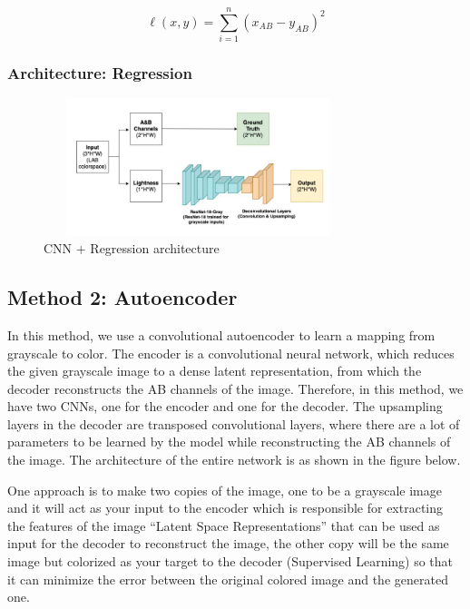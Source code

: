 \documentclass{article}
\begin{document}
{\Large
\begin{equation}
    \ell(x,y) = \sum_{i=1}^{n} \left( x_{AB} - y_{AB} \right)^2
\end{equation}}


\subsubsection{Architecture: Regression}
\begin{figure}[htbp!]
    \centering
        \includegraphics[width=9cm, height=4cm]{reg.jpg}
        \caption{CNN + Regression architecture}
    \end{figure}
    

\subsection{Method 2: Autoencoder}
In this method, we use a convolutional autoencoder to learn a mapping from grayscale to color.
The encoder is a convolutional neural network, which reduces the given grayscale image to a dense latent representation, from which the decoder reconstructs the AB channels of the image.
Therefore, in this method, we have two CNNs, one for the encoder and one for the decoder.
The upsampling layers in the decoder are transposed convolutional layers, where there are a lot of parameters to be learned by the model while reconstructing the AB channels of the image.
The architecture of the entire network is as shown in the figure below. 


One approach is to make two copies of the image, one to be a grayscale image and it will act as your input to the encoder which is responsible for extracting the features of the image 
“Latent Space Representations” that can be used as input for the decoder to reconstruct the image, the other copy will be the same image but colorized as your target to the decoder (Supervised Learning) so that it can minimize the error between the original colored image and the generated one.
\end{document}
